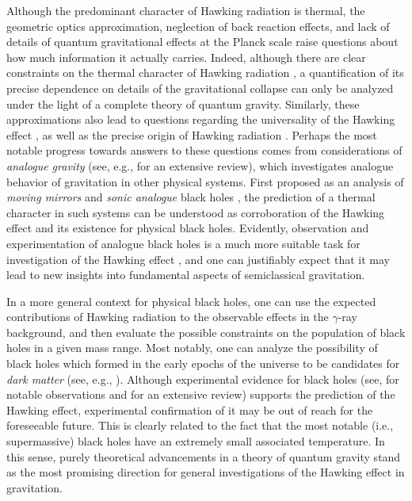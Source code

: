 \documentclass[
12pt,		%
openright,	%
twoside,  %
a4paper,			%
chapter=TITLE,		%
english,			%
french,				%
spanish,			%
brazil				%
]{USPSC-classe/USPSC}
\begin{document}
Although the predominant character of Hawking radiation is thermal, the geometric optics approximation, neglection of back reaction effects, and lack of details of quantum gravitational effects at the Planck scale raise questions about how much information it actually carries. Indeed, although there are clear constraints on the thermal character of Hawking radiation \cite{Visser2015}, a quantification of its precise dependence on details of the gravitational collapse can only be analyzed under the light of a complete theory of quantum gravity. Similarly, these approximations also lead to questions regarding the universality of the Hawking effect \cite{Unruh2005}, as well as the precise origin of Hawking radiation \cite{Giddings2016}. Perhaps the most notable progress towards answers to these questions comes from considerations of \textit{analogue gravity} (see, e.g., \cite{Barceló2011} for an extensive review), which investigates analogue behavior of gravitation in other physical systems. First proposed as an analysis of \textit{moving mirrors} \cite{Fulling1976, Birrell1984} and \textit{sonic analogue} black holes \cite{Unruh1981, Unruh1995}, the prediction of a thermal character in such systems can be understood as corroboration of the Hawking effect and its existence for physical black holes. Evidently, observation and experimentation of analogue black holes is a much more suitable task for investigation of the Hawking effect \cite{Modugno2021, Kolobov2021, Wilson2011}, and one can justifiably expect that it may lead to new insights into fundamental aspects of semiclassical gravitation. 

In a more general context for physical black holes, one can use the expected contributions of Hawking radiation to the observable effects in the $\gamma$-ray background, and then evaluate the possible constraints on the population of black holes in a given mass range. Most notably, one can analyze the possibility of black holes which formed in the early epochs of the universe to be candidates for \textit{dark matter} (see, e.g., \cite{Green2021}). Although experimental evidence for black holes (see, \cite{Genzel2010, Event2019, Narayan1995} for notable observations and \cite{Rees1998} for an extensive review) supports the prediction of the Hawking effect, experimental confirmation of it may be out of reach for the foreseeable future. This is clearly related to the fact that the most notable (i.e., supermassive) black holes have an extremely small associated temperature. In this sense, purely theoretical advancements in a theory of quantum gravity stand as the most promising direction for general investigations of the Hawking effect in gravitation.
\end{document}
